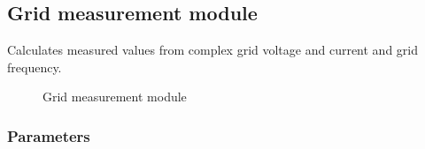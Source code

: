 \documentclass[
  a4paper,
  DIV=11,
  numbers=noendperiod]{scrartcl}
\begin{document}
\subsection{Grid measurement module}\label{grid-measurement-module}

Calculates measured values from complex grid voltage and current and
grid frequency.

\begin{figure}


\caption{\label{fig-measurementModule}Grid measurement module}

\end{figure}%

\subsubsection{Parameters}\label{parameters-6}
\end{document}

